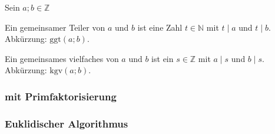 Sein $a;b \in \mathbb{Z}$

Ein gemeinsamer Teiler von $a$ und $b$ ist eine Zahl $t \in \mathbb{N}$ mit $t \mid a$ und $t \mid b$.
Abkürzung: $\textrm{ggt}(a;b)$.

Ein gemeinsames vielfaches von $a$ und $b$ ist ein $s \in \mathbb{Z}$ mit $a \mid s$ und $b \mid s$.
Abkürzung: $\textrm{kgv}(a;b)$.

\subsubsection{mit Primfaktorisierung}


\subsubsection{Euklidischer Algorithmus}

